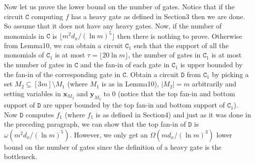 Now let us prove the lower bound on the number of gates. Notice that if the circuit $\mathtt C$ computing $f$ has a heavy gate as defined in Section3 then we are done. So assume that it does not have any heavy gates. Now, if the number of monomials in $\mathtt C$ is $\lfloor m^2d_x/(\ln m)^5\rfloor$ then there is nothing to prove. Otherwise from Lemma10, we can obtain a circuit $\mathtt C_1$ such that the support of all the monomials of $\mathtt C_1$ is at most $\tau=\lfloor20\ln m\rfloor$, the number of gates in $\mathtt C_1$ is at most the number of gates in $\mathtt C$ and the fan-in of each gate in $\mathtt C_1$ is upper bounded by the fan-in of the corresponding gate in $\mathtt C$. Obtain a circuit $\mathtt D$ from $\mathtt C_1$ by picking a set $M_2\subseteq[3m]\setminus M_1$ (where $M_1$ is as in Lemma10), $|M_2|=m$ arbitrarily and setting variables in $\mathbf x_{M_2}$ and $\mathbf y_{M_2}$ to 0 (notice that the top fan-in and bottom support of $\mathtt D$ are upper bounded by the top fan-in and bottom support of $\mathtt C_1$). Now $\mathtt D$ computes $f_1$ (where $f_1$ is as defined in Section4) and just as it was done in the preceding paragraph, we can show that the top fan-in of $\mathtt D$ is $\omega(m^2d_x/(\ln m)^5)$. However, we only get an $\Omega(md_x/(\ln m)^3)$ lower bound on the number of gates since the definition of a heavy gate is the bottleneck.
